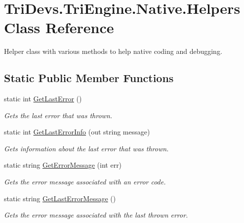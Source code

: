 \hypertarget{class_tri_devs_1_1_tri_engine_1_1_native_1_1_helpers}{\section{Tri\-Devs.\-Tri\-Engine.\-Native.\-Helpers Class Reference}
\label{class_tri_devs_1_1_tri_engine_1_1_native_1_1_helpers}
}


Helper class with various methods to help native coding and debugging.  


\subsection*{Static Public Member Functions}
\begin{DoxyCompactItemize}
\item 
static int \hyperlink{class_tri_devs_1_1_tri_engine_1_1_native_1_1_helpers_a66b2a4b678b13d0274d93c3f699cc7cc}{Get\-Last\-Error} ()
\begin{DoxyCompactList}\small\item\em Gets the last error that was thrown. \end{DoxyCompactList}\item 
static int \hyperlink{class_tri_devs_1_1_tri_engine_1_1_native_1_1_helpers_acb47b6c89cb5cdaac07f705860246947}{Get\-Last\-Error\-Info} (out string message)
\begin{DoxyCompactList}\small\item\em Gets information about the last error that was thrown. \end{DoxyCompactList}\item 
static string \hyperlink{class_tri_devs_1_1_tri_engine_1_1_native_1_1_helpers_afb569ef7723a943a9d2c42d87d06dcf9}{Get\-Error\-Message} (int err)
\begin{DoxyCompactList}\small\item\em Gets the error message associated with an error code. \end{DoxyCompactList}\item 
static string \hyperlink{class_tri_devs_1_1_tri_engine_1_1_native_1_1_helpers_afc6785502d25bf7680ee773bd3185d82}{Get\-Last\-Error\-Message} ()
\begin{DoxyCompactList}\small\item\em Gets the error message associated with the last thrown error. \end{DoxyCompactList}\item 

\end{DoxyCompactItemize}
